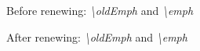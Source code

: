 
\let\oldEmph\emph

Before renewing: \oldEmph{\textbackslash oldEmph} and \emph{\textbackslash emph} 

\renewcommand{\emph}[1]{{\color{red}\oldEmph{#1}}}

After renewing: \oldEmph{\textbackslash oldEmph} and \emph{\textbackslash emph}
